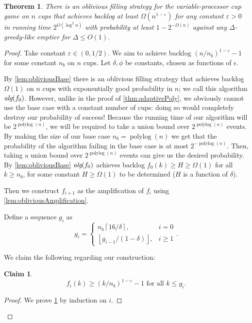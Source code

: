 \documentclass[twocolumn]{article}[10pt]
\DeclareMathOperator{\polylog}{\text{polylog}}
\newcommand{\alg}[1]{\textit{\text{alg}}({#1})}
\newcommand{\floor}[1]{\left\lfloor #1 \right\rfloor}
\newcommand{\ceil}[1]{\left\lceil #1 \right\rceil}
\newtheorem{clm}{Claim}
\newtheorem{theorem}{Theorem}
\begin{document}
\begin{theorem}
  \label{thm:obliviousPoly}
  There is an oblivious filling strategy for the
  variable-processor cup game on $n$ cups that achieves backlog
  at least $\Omega(n^{1-\varepsilon})$ for any constant $\varepsilon
  >0$ in running time $2^{O(\log^2 n)}$ with probability at least
  $1-2^{-\Omega(n)}$ against any $\Delta$-greedy-like emptier for
  $\Delta \le O(1)$.
\end{theorem}
\begin{proof}
  Take constant $\varepsilon \in (0, 1/2)$.
  We aim to achieve backlog $(n/n_b)^{1-\varepsilon}-1$ for some constant $n_b$ on $n$ cups.
  Let $\delta, \phi$ be constants, chosen as functions of $\epsilon$.

  By \cref{lem:obliviousBase} there is an oblivious filling
  strategy that achieves backlog $\Omega(1)$ on $n$ cups with
  exponentially good probability in $n$; we call this algorithm
  $\alg{f_0}$.
  However, unlike in the proof of \cref{thm:adaptivePoly}, we
  obviously cannot use the base case with a constant number of
  cups: doing so would completely destroy our probability of
  success! Because the running time of our algorithm will be
  $2^{\polylog(n)}$, we will be required to take a union bound
  over $2^{\polylog(n)}$ events. By making the size of our base
  case $n_b = \polylog(n)$ we get that the probability of the
  algorithm failing in the base case is at most
  $2^{-\polylog(n)}$. Then, taking a union bound over
  $2^{\polylog(n)}$ events can give us the desired probability.
  By \cref{lem:obliviousBase} $\alg{f_0}$ achieves backlog
  $f_0(k) \ge H \ge \Omega(1)$ for all $k \ge n_b$, for some
  constant $H \ge \Omega(1)$ to be determined ($H$ is a function
  of $\delta$).

  Then we construct $f_{i+1}$ as the amplification of $f_i$ using
  \cref{lem:obliviousAmplification}.

  Define a sequence $g_i$ as 
  $$g_i =
  \begin{cases}
    n_b\ceil{16/\delta}, & i=0\\
    \floor{ g_{i-1}/(1-\delta) }, & i\ge 1 
  \end{cases}.$$

  We claim the following regarding our construction:
  \begin{clm}
    \label{clm:fikinductionagain}
    \begin{equation}
      f_i(k) \ge (k/n_b)^{1-\varepsilon} - 1 \text{ for all } k \le g_i. \label{eqn:fikinductionAGAIN}
    \end{equation}
  \end{clm}
  \begin{proof}
  We prove \cref{clm:fikinductionagain} by induction on $i$. 


\end{proof}
\end{proof}
\end{document}
